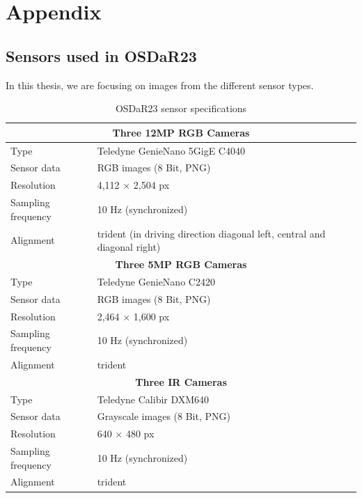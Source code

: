 \documentclass[Master,MDS,english]{BASE/twbook} %
\begin{document}
    
    

\clearpage


\appendix
\chapter{Appendix}

\section{Sensors used in OSDaR23} \label{app:sensors}

In this thesis, we are focusing on images from the different sensor types. 

\begin{table}[htbp]
  \centering
  \footnotesize
  \begin{tabular}{|l|l|}
    \hline
    \multicolumn{2}{|c|}{\textbf{Three 12MP RGB Cameras}}  \\
    \hline
    Type & Teledyne GenieNano 5GigE C4040  \\
    Sensor data & RGB images (8 Bit, PNG)  \\
    Resolution & 4,112 $\times$ 2,504 px  \\
    Sampling frequency & 10 Hz (synchronized)  \\
    Alignment & trident (in driving direction diagonal left, central and diagonal right)  \\
    \hline
    \multicolumn{2}{|c|}{\textbf{Three 5MP RGB Cameras}}  \\
    \hline
    Type & Teledyne GenieNano C2420  \\
    Sensor data & RGB images (8 Bit, PNG)  \\
    Resolution & 2,464 $\times$ 1,600 px \\
    Sampling frequency & 10 Hz (synchronized)  \\
    Alignment & trident  \\
    \hline
    \multicolumn{2}{|c|}{\textbf{Three IR Cameras}}  \\
    \hline
    Type & Teledyne Calibir DXM640  \\
    Sensor data & Grayscale images (8 Bit, PNG)  \\
    Resolution & 640 $\times$ 480 px  \\
    Sampling frequency & 10 Hz (synchronized)  \\
    Alignment & trident  \\
    \hline
  \end{tabular}
  \caption{OSDaR23 sensor specifications}
  \label{tab:cameras}
\end{table}
\end{document}

